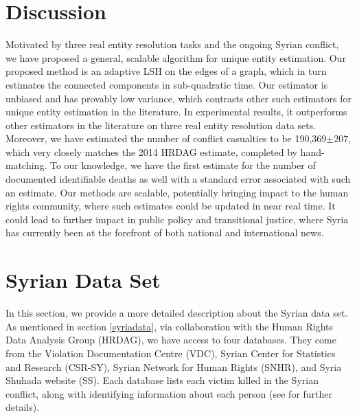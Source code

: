 \documentclass[aoas]{imsart}
\begin{document}
\section{Discussion}
Motivated by three real entity resolution tasks and the ongoing Syrian conflict, we have proposed a general, scalable algorithm for unique entity estimation. Our proposed method is an adaptive LSH on the edges of a graph, which in turn estimates the connected components in sub-quadratic time. Our estimator is unbiased and has provably low variance, which contrasts other such estimators for unique entity estimation in the literature. In experimental results, it outperforms other estimators in the literature on three real entity resolution data sets. Moreover, we have estimated the number of conflict casualties to be 190,369$\pm207$, which very closely matches the 2014 HRDAG estimate, completed by hand-matching. To our knowledge, we have the first estimate for the number of documented identifiable deaths as well with a standard error associated with such an estimate.
Our methods are scalable, potentially bringing impact to the human rights community, where such estimates could be updated in near real time. It could lead to further impact in public policy and transitional justice, where Syria has currently been at the forefront of both national and international news.
%

\clearpage
\newpage

%
%
%



\clearpage
\newpage

\appendix

\section{Syrian Data Set}
\label{sec:syrian}
In this section, we provide a more detailed description about the Syrian data set. As mentioned in section \ref{syriadata}, via
collaboration with the Human Rights Data Analysis Group (HRDAG), we have access to four databases. They come from the Violation Documentation Centre (VDC), Syrian Center for Statistics and Research (CSR-SY), Syrian Network for Human Rights (SNHR), and Syria Shuhada website (SS). Each database lists each victim killed in the Syrian conflict, along with identifying information about each person (see \cite{price_2013} for further details).
\end{document}
